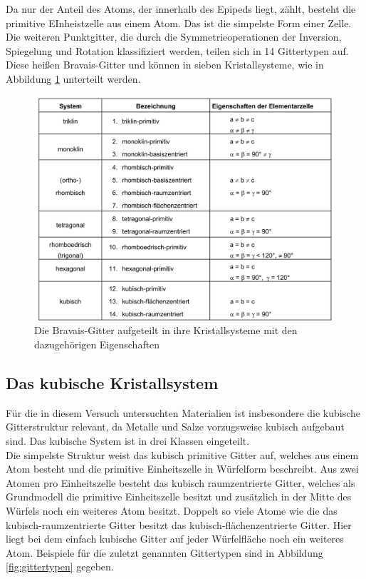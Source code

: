 Da nur der Anteil des Atoms, der innerhalb des Epipeds liegt, zählt, besteht die primitive EInheistzelle aus einem Atom.
Das ist die simpelste Form einer Zelle. 
Die weiteren Punktgitter, die durch die Symmetrieoperationen der Inversion, Spiegelung und Rotation klassifiziert werden, teilen sich in 14 Gittertypen auf. 
Diese heißen Bravais-Gitter und können in sieben Kristallsysteme, wie in Abbildung \ref{fig:System} unterteilt werden.
\begin{figure}
	\centering
	\includegraphics[width = \textwidth]{Abbildungen/System.png}
	\caption{Die Bravais-Gitter aufgeteilt in ihre Kristallsysteme mit den dazugehörigen Eigenschaften \cite{Anleitung}}
	\label{fig:System}
\end{figure} 
\subsection{Das kubische Kristallsystem}
Für die in diesem Versuch untersuchten Materialien ist insbesondere die kubische Gitterstruktur relevant, da Metalle und Salze vorzugsweise kubisch aufgebaut sind.
Das kubische System ist in drei Klassen eingeteilt.\\
Die simpelste Struktur weist das kubisch primitive Gitter auf, welches aus einem Atom besteht und die primitive Einheitszelle in Würfelform beschreibt.
Aus zwei Atomen pro Einheitszelle besteht das kubisch raumzentrierte Gitter, welches als Grundmodell die primitive Einheitszelle besitzt und zusätzlich in der Mitte des Würfels noch ein weiteres Atom besitzt.
Doppelt so viele Atome wie die das kubisch-raumzentrierte Gitter besitzt das kubisch-flächenzentrierte Gitter.
Hier liegt bei dem einfach kubische Gitter auf jeder Würfelfläche noch ein weiteres Atom.
Beispiele für die zuletzt genannten Gittertypen sind in Abbildung \ref{fig:gittertypen} gegeben.

